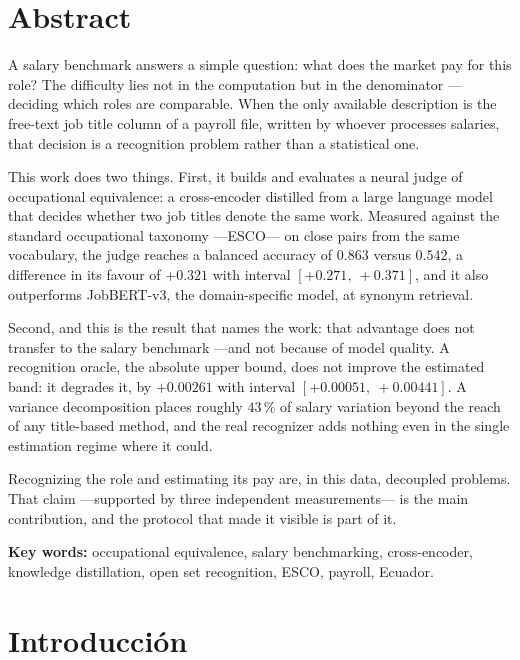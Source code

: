 \documentclass[12pt,a4paper,oneside]{report}
\begin{document}
\chapter*{Abstract}

A salary benchmark answers a simple question: what does the market pay for this role? The
difficulty lies not in the computation but in the denominator ---deciding which roles are
comparable. When the only available description is the free-text job title column of a
payroll file, written by whoever processes salaries, that decision is a recognition
problem rather than a statistical one.

This work does two things. First, it builds and evaluates a neural judge of occupational
equivalence: a cross-encoder distilled from a large language model that decides whether
two job titles denote the same work. Measured against the standard occupational taxonomy
---ESCO--- on close pairs from the same vocabulary, the judge reaches a balanced accuracy
of $0.863$ versus $0.542$, a difference in its favour of $+0.321$ with interval
$[+0.271,\ +0.371]$, and
it also outperforms JobBERT-v3, the domain-specific model, at synonym retrieval.

Second, and this is the result that names the work: that advantage does not transfer to
the salary benchmark ---and not because of model quality. A recognition oracle, the
absolute upper bound, does not improve the estimated band: it degrades it, by $+0.00261$
with interval $[+0.00051,\ +0.00441]$. A variance decomposition places roughly $43\,\%$ of
salary variation beyond the reach of any title-based method, and the real recognizer adds
nothing even in the single estimation regime where it could.

Recognizing the role and estimating its pay are, in this data, decoupled problems. That
claim ---supported by three independent measurements--- is the main contribution, and the
protocol that made it visible is part of it.

\vspace{0.6cm}
\noindent\textbf{Key words:} occupational equivalence, salary benchmarking, cross-encoder,
knowledge distillation, open set recognition, ESCO, payroll, Ecuador.

\tableofcontents
\listoffigures
\listoftables

\chapter{Introducción}
\label{cap:problema}
\end{document}
